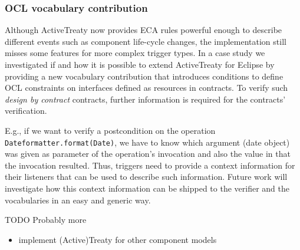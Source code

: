 \documentclass{llncs}
\begin{document}
\subsubsection{OCL vocabulary contribution}

Although ActiveTreaty now provides ECA rules powerful enough to describe different events such as component life-cycle changes, the implementation still misses some features for more complex trigger types. In a case study \cite{DAWilke} we investigated if and how it is possible to extend ActiveTreaty for Eclipse by providing a new vocabulary contribution that introduces conditions to define OCL constraints \cite{OCL20} on interfaces defined as resources in contracts. To verify such \textit{design by contract} \cite{DesignByContract,meyerOOSC} contracts, further information is required for the contracts' verification.

E.g., if we want to verify a postcondition on the operation \texttt{Date\-for\-mat\-ter\linebreak[0].for\-mat(Date)}, we have to know which argument (date object) was given as parameter of the operation's invocation and also the value in that the invocation resulted. Thus, triggers need to provide a context information for their listeners that can be used to describe such information. Future work will investigate how this context information can be shipped to the verifier and the vocabularies in an easy and generic way.

TODO Probably more

\begin{itemize}
	\item implement (Active)Treaty for other component models
\end{itemize}



  
    
\end{document}
